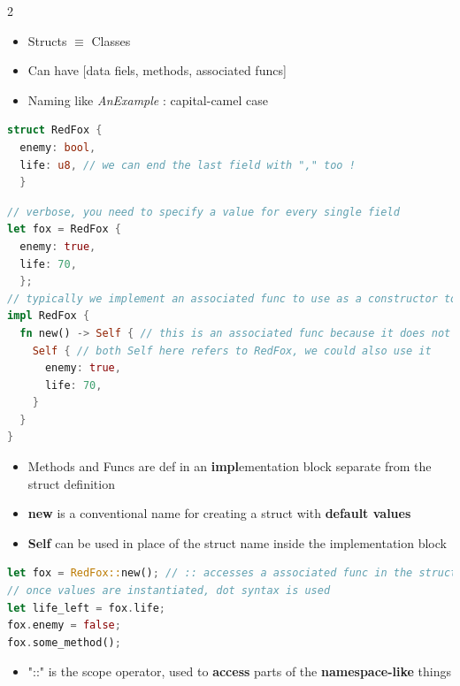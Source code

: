 \documentclass{report}
\begin{document}
\begin{multicols*}{2}

\begin{itemize}
  \item Structs $\equiv $ Classes 
  \item Can have [data fiels, methods, associated funcs] 
  \item Naming like \textit{AnExample} : capital-camel case 
\end{itemize}

\begin{tcolorbox}[title=Syntax,colback=backcolour,size=small,left=4mm]
\begin{lstlisting}[language=rust]
struct RedFox {
  enemy: bool,
  life: u8, // we can end the last field with "," too !
  }
\end{lstlisting}
\end{tcolorbox}

\begin{tcolorbox}[title=Init Struct,colback=backcolour,size=small,left=4mm]
\begin{lstlisting}[language=rust]
// verbose, you need to specify a value for every single field
let fox = RedFox {
  enemy: true,
  life: 70,
  }; 
// typically we implement an associated func to use as a constructor to create a struct with default values and then call that
impl RedFox {
  fn new() -> Self { // this is an associated func because it does not have a form of self as its first param
    Self { // both Self here refers to RedFox, we could also use it 
      enemy: true,
      life: 70,
    }
  }
}
\end{lstlisting}
\end{tcolorbox}

\begin{itemize}
  \item Methods and Funcs are def in an \textbf{impl}ementation block separate from the struct definition 
  \item \textbf{new} is a conventional name for creating a struct with \textbf{default values} 
  \item \textbf{Self} can be used in place of the struct name inside the implementation block 
\end{itemize}

\begin{tcolorbox}[title=Creating,colback=backcolour,size=small,left=4mm]
\begin{lstlisting}[language=rust]
let fox = RedFox::new(); // :: accesses a associated func in the struct
// once values are instantiated, dot syntax is used
let life_left = fox.life;
fox.enemy = false;
fox.some_method();
\end{lstlisting}
\end{tcolorbox}
\begin{itemize}
  \item "::" is the scope operator, used to \textbf{access} parts of the \textbf{namespace-like} things
\end{itemize}


\end{multicols*}
\end{document}
